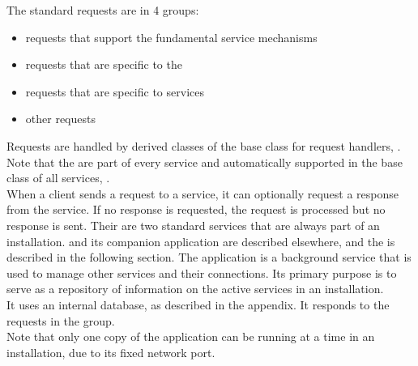 The standard requests are in 4 groups:
\begin{itemize}
\item \textbf{} requests that support the
fundamental \mplusm{} service mechanisms
\item \textbf{} requests
that are specific to the 
\item \textbf{} requests that
are specific to  services
\item \textbf{} other
requests
\end{itemize}
Requests are handled by derived classes of the base class for request handlers,
.
Note that the  are part of every service and
automatically supported in the base class of all services,
.\\

When a client sends a request to a service, it can optionally request a response from the
service.
If no response is requested, the request is processed but no response is sent.
Their are two standard services that are always part of an \mplusm{} installation.
 and its companion application
 are described elsewhere, and the
 is described in the following section.
The  application is a background service
that is used to manage other services and their connections.
Its primary purpose is to serve as a repository of information on the active services in
an \mplusm{} installation.\\

It uses an internal database, as described in the
 appendix.
It responds to the requests in the
 group.\\

Note that only one copy of the 
application can be running at a time in an \mplusm{} installation, due to its fixed
\yarp{} network port.\\


